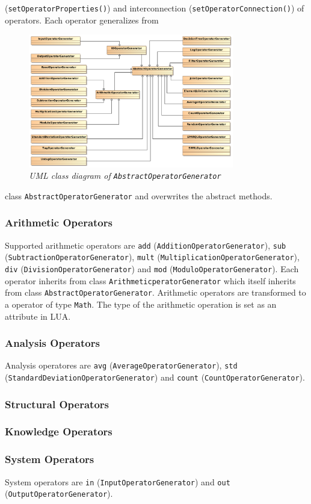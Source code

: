 (\texttt{setOperatorProperties()}) and interconnection 
(\texttt{setOperatorConnection()}) of operators. Each operator generalizes from
\begin{figure}[htpb]
  \centering
  \includegraphics[width=0.8\textwidth]{figures/overview}
  \caption{\emph{UML class diagram of \texttt{AbstractOperatorGenerator}}}
  \label{fig:abstractoperatorgenerator}
\end{figure}
class \texttt{AbstractOperatorGenerator} and overwrites the abstract methods.

\subsubsection{Arithmetic Operators}
Supported arithmetic operators are \texttt{add} 
(\texttt{AdditionOperatorGenerator}), \texttt{sub} 
(\texttt{Subtraction\-OperatorGenerator}), \texttt{mult} 
(\texttt{MultiplicationOperatorGenerator}), \texttt{div} 
(\texttt{DivisionOperator\-Generator}) and \texttt{mod} 
(\texttt{ModuloOperatorGenerator}). Each operator inherits from class 
\texttt{Arithm\-eticperatorGenerator} which itself inherits from class
\texttt{AbstractOperatorGenerator}. Arithmetic operators are transformed to a
operator of type \texttt{Math}. The type of the arithmetic operation is set
as an attribute in LUA.

\subsubsection{Analysis Operators}
Analysis operatores are \texttt{avg} (\texttt{AverageOperatorGenerator}), 
\texttt{std} (\texttt{StandardDeviationOperatorGenerator}) and \texttt{count}
(\texttt{CountOperatorGenerator}).

\subsubsection{Structural Operators}

\subsubsection{Knowledge Operators}

\subsubsection{System Operators}
System operators are \texttt{in} (\texttt{InputOperatorGenerator}) and 
\texttt{out} (\texttt{OutputOperatorGenerator}).
